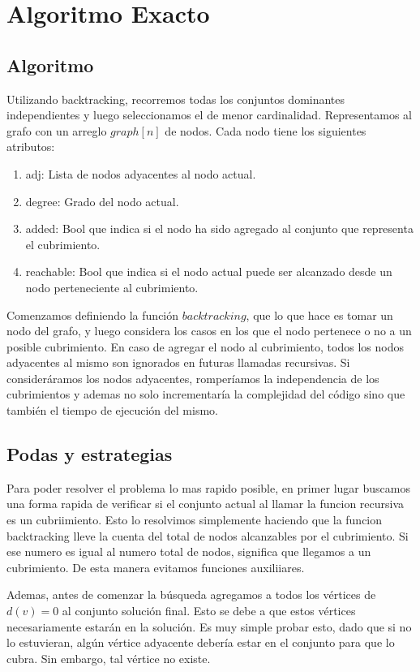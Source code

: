 \section{Algoritmo Exacto}

\subsection{Algoritmo}
Utilizando backtracking, recorremos todas los conjuntos dominantes independientes y luego seleccionamos el de menor cardinalidad.
Representamos al grafo con un arreglo $graph[n]$ de nodos. Cada nodo tiene los siguientes atributos:

\begin{enumerate}
	\item adj: Lista de nodos adyacentes al nodo actual.
	\item degree: Grado del nodo actual.
	\item added: Bool que indica si el nodo ha sido agregado al conjunto que representa el cubrimiento.
	\item reachable: Bool que indica si el nodo actual puede ser alcanzado desde un nodo perteneciente al cubrimiento.
\end{enumerate}

Comenzamos definiendo la función $backtracking$, que lo que hace es tomar un nodo del grafo, y luego considera los casos en los que el nodo pertenece o no a un posible cubrimiento. En caso de agregar el nodo al cubrimiento, todos los nodos adyacentes al mismo son ignorados en futuras llamadas recursivas. Si consideráramos los nodos adyacentes, romperíamos la independencia de los  cubrimientos y ademas no solo incrementaría la complejidad del código sino que también el tiempo de ejecución del mismo.

\subsection{Podas y estrategias}

Para poder resolver el problema lo mas rapido posible, en primer lugar buscamos una forma rapida de verificar si el conjunto actual al llamar la funcion recursiva es un cubriimiento. Esto lo resolvimos simplemente haciendo que la funcion backtracking lleve la cuenta del total de nodos alcanzables por el cubrimiento. Si ese numero es igual al numero total de nodos, significa que llegamos a un cubrimiento. De esta manera evitamos funciones auxiliiares.

Ademas, antes de comenzar la búsqueda agregamos a todos los vértices de $d(v) = 0$ al conjunto solución final. Esto se debe a que estos vértices necesariamente estarán en la solución. Es muy simple probar esto, dado que si no lo estuvieran, algún vértice adyacente debería estar en el conjunto para que lo cubra. Sin embargo, tal vértice no existe.


